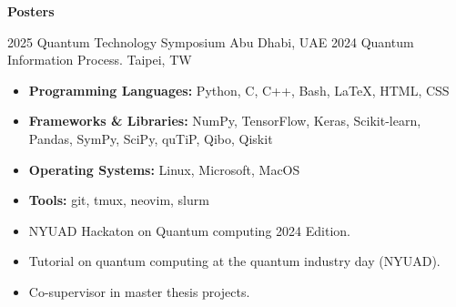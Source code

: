 \documentclass[9pt]{developercv} %
\begin{document}
\textbf{Posters}\\
\begin{entrylist}
    \entry
        {2025}
        {\small{Quantum Technology Symposium}}
        {Abu Dhabi, UAE}
        {}
        {}
    \entry
        {2024}
        {\small{Quantum Information Process.}}
        {Taipei, TW}
        {}
        {}
\end{entrylist}





\begin{itemize}[leftmargin=*, topsep=0pt]
\setlength\itemsep{0pt}
    \item \textbf{Programming Languages:} Python, C, C++, Bash, \LaTeX, HTML, CSS
    \item \textbf{Frameworks \& Libraries:} NumPy, TensorFlow, Keras, Scikit-learn, Pandas, SymPy, SciPy, quTiP, Qibo, Qiskit
    \item \textbf{Operating Systems:} Linux, Microsoft, MacOS
    \item \textbf{Tools:} git, tmux, neovim, slurm
\end{itemize}


	
\begin{itemize}[leftmargin=*, topsep=0pt]
\item NYUAD Hackaton on Quantum computing 2024 Edition.
\item Tutorial on quantum computing at the quantum industry day (NYUAD).
\item Co-supervisor in master thesis projects.
\end{itemize}

	
\end{document}

